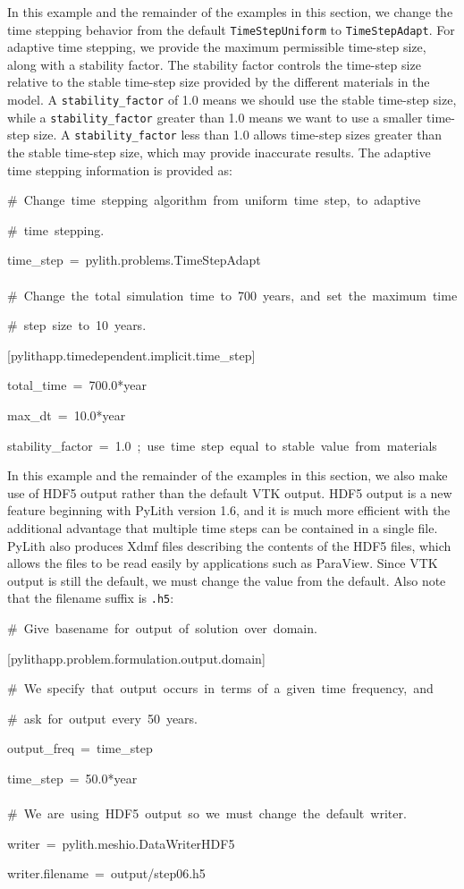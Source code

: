 In this example and the remainder of the examples in this section,
we change the time stepping behavior from the default \texttt{TimeStepUniform}
to \texttt{TimeStepAdapt}. For adaptive time stepping, we provide
the maximum permissible time-step size, along with a stability factor.
The stability factor controls the time-step size relative to the stable
time-step size provided by the different materials in the model. A
\texttt{stability\_factor} of 1.0 means we should use the stable time-step
size, while a \texttt{stability\_factor} greater than 1.0 means we
want to use a smaller time-step size. A \texttt{stability\_factor}
less than 1.0 allows time-step sizes greater than the stable time-step
size, which may provide inaccurate results. The adaptive time stepping
information is provided as:
\begin{lyxcode}
\#~Change~time~stepping~algorithm~from~uniform~time~step,~to~adaptive

\#~time~stepping.

time\_step~=~pylith.problems.TimeStepAdapt~\\
~\\


\#~Change~the~total~simulation~time~to~700~years,~and~set~the~maximum~time

\#~step~size~to~10~years.

{[}pylithapp.timedependent.implicit.time\_step{]}

total\_time~=~700.0{*}year

max\_dt~=~10.0{*}year

stability\_factor~=~1.0~;~use~time~step~equal~to~stable~value~from~materials
\end{lyxcode}
In this example and the remainder of the examples in this section,
we also make use of HDF5 output rather than the default VTK output.
HDF5 output is a new feature beginning with PyLith version 1.6, and
it is much more efficient with the additional advantage that multiple
time steps can be contained in a single file. PyLith also produces
Xdmf files describing the contents of the HDF5 files, which allows
the files to be read easily by applications such as ParaView. Since
VTK output is still the default, we must change the value from the
default. Also note that the filename suffix is \texttt{.h5}:
\begin{lyxcode}
\#~Give~basename~for~output~of~solution~over~domain.

{[}pylithapp.problem.formulation.output.domain{]}

\#~We~specify~that~output~occurs~in~terms~of~a~given~time~frequency,~and

\#~ask~for~output~every~50~years.

output\_freq~=~time\_step

time\_step~=~50.0{*}year~\\
~\\


\#~We~are~using~HDF5~output~so~we~must~change~the~default~writer.

writer~=~pylith.meshio.DataWriterHDF5

writer.filename~=~output/step06.h5~~
\end{lyxcode}
